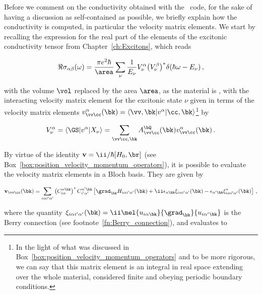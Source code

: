 Before we comment on the conductivity obtained with the \xatu~code, for the sake of having a discussion as self-contained as possible, we briefly explain how the conductivity is computed, in particular the velocity matrix elements.
We start by recalling the expression for the real part of the elements of the excitonic conductivity tensor from Chapter~\ref{ch:Excitons}, which reads

\begin{equation}
    \label{eq:excitonic_Re_optical_conductivity_repeated}
    \Re{\sigma_{\alpha\beta}(\omega)}=\frac{\pi e^{2}\hbar}{\area}\sum_{\nu}\frac{1}{E_{\nu}} V^{\alpha}_{\nu} \big(V^{\beta}_{\nu}\big)^* \delta(\hbar \omega - E_{\nu})\,,
\end{equation}

\noindent with the volume $\vol$ replaced by the area $\area$, as the material is \bd, with the interacting velocity matrix element for the excitonic state $\nu$ given in terms of the velocity matrix elements $v^{\alpha}_{\vv \cc}(\bk) = \langle \vv,\bk |v^{\alpha}| \cc,\bk \rangle$\footnote{In the light of what was discussed in Box~\ref{box:position_velocity_momentum_operators} and to be more rigorous, we can say that this matrix element is an integral in real space extending over the whole material, considered finite and obeying periodic boundary conditions.} by

\begin{equation}
    \label{eq:excitonic_velocity_matrix_elements_repeated}
    V^{\alpha}_{\nu} = \langle \GS |v^{\alpha}| X_{\nu}\rangle = \sum_{\vv \cc, \bk} A^{\bQ}_{\vv \cc}(\bk) v^{\alpha}_{\vv \cc}(\bk)\,.
\end{equation}

\noindent By virtue of the identity $\mathbf{v} = \ii/\hbar [H_0,\br]$ (see Box~\ref{box:position_velocity_momentum_operators}), it is possible to evaluate the velocity matrix elements in a Bloch basis.
They are given by~\cite{Xatu,Esteve_2023,Esteve_PhD}

\begin{equation}
    \label{eq:velocity_matrix_elements_Bloch_basis}
    \mathbf{v}_{\vv \cc} (\bk) = \sum_{i \alpha i' \alpha'} \left(C^{n\bk}_{i\alpha}\right)^* C^{n'\bk}_{i'\alpha'} \left[\grad_{\bk} H_{i\alpha i'\alpha'}(\bk) + \ii \epsilon_{n\bk} \xi_{i \alpha i' \alpha'}(\bk) - \epsilon_{n'\bk} \xi_{i \alpha i' \alpha'}^*(\bk)\right] \,,
\end{equation}

\noindent where the quantity $\xi_{i \alpha i' \alpha'}(\bk) = \ii \mel{u_{i\alpha \bk}}{\grad_{\bk}}{u_{i\alpha'\bk}}$ is the Berry connection (see footnote~\ref{fn:Berry_connection}), and evaluates to~\cite{Xatu,Esteve_2023,Esteve_PhD}

